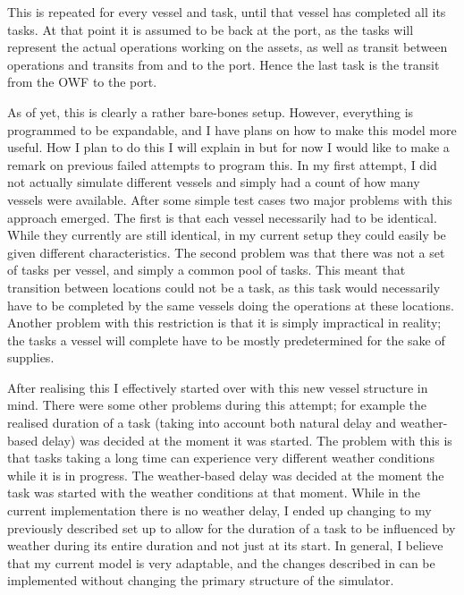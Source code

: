 \documentclass[a4paper,12pt]{article}
\begin{document}
This is repeated for every vessel and task, until that vessel has completed all its tasks. At that point it is assumed to be back at the port, as the tasks will represent the actual operations working on the assets, as well as transit between operations and transits from and to the port. Hence the last task is the transit from the OWF to the port. 

\bigskip

As of yet, this is clearly a rather bare-bones setup. However, everything is programmed to be expandable, and I have plans on how to make this model more useful. How I plan to do this I will explain in  but for now I would like to make a remark on previous failed attempts to program this. In my first attempt, I did not actually simulate different vessels and simply had a count of how many vessels were available. After some simple test cases two major problems with this approach emerged. The first is that each vessel necessarily had to be identical. While they currently are still identical, in my current setup they could easily be given different characteristics. The second problem was that there was not a set of tasks per vessel, and simply a common pool of tasks. This meant that transition between locations could not be a task, as this task would necessarily have to be completed by the same vessels doing the operations at these locations. Another problem with this restriction is that it is simply impractical in reality; the tasks a vessel will complete have to be mostly predetermined for the sake of supplies.

After realising this I effectively started over with this new vessel structure in mind. There were some other problems during this attempt; for example the realised duration of a task (taking into account both natural delay and weather-based delay) was decided at the moment it was started. The problem with this is that tasks taking a long time can experience very different weather conditions while it is in progress. The weather-based delay was decided at the moment the task was started with the weather conditions at that moment. While in the current implementation there is no weather delay, I ended up changing to my previously described set up to allow for the duration of a task to be influenced by weather during its entire duration and not just at its start. In general, I believe that my current model is very adaptable, and the changes described in  can be implemented without changing the primary structure of the simulator. 
\end{document}
